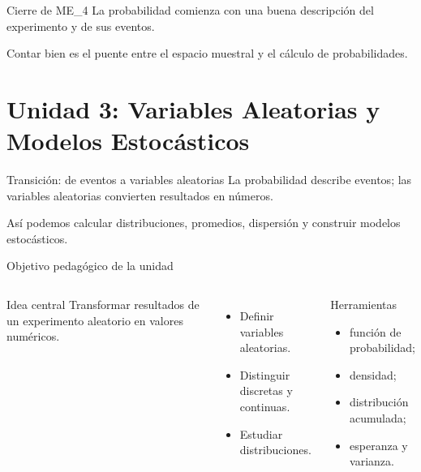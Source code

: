 \documentclass[aspectratio=169,11pt]{beamer}
\begin{document}
\begin{frame}{Cierre de ME\_4}
\centering
\Large
La probabilidad comienza con una buena descripción del experimento y de sus eventos.
\vspace{0.8em}

\normalsize
Contar bien es el puente entre el espacio muestral y el cálculo de probabilidades.
\end{frame}

\part{Unidad 3: Variables Aleatorias y Modelos Estocásticos}

\begin{frame}{Transición: de eventos a variables aleatorias}
\centering
\Large
La probabilidad describe eventos; las variables aleatorias convierten resultados en números.
\vspace{0.7em}

\normalsize
Así podemos calcular distribuciones, promedios, dispersión y construir modelos estocásticos.
\end{frame}

\begin{frame}{Objetivo pedagógico de la unidad}
\begin{columns}[T]
\begin{block}{Idea central}
Transformar resultados de un experimento aleatorio en valores numéricos.
\end{block}
\begin{itemize}
  \item Definir variables aleatorias.
  \item Distinguir discretas y continuas.
  \item Estudiar distribuciones.
\end{itemize}
\begin{exampleblock}{Herramientas}
\begin{itemize}
  \item función de probabilidad;
  \item densidad;
  \item distribución acumulada;
  \item esperanza y varianza.
\end{itemize}
\end{exampleblock}
\end{columns}
\end{frame}
\end{document}
